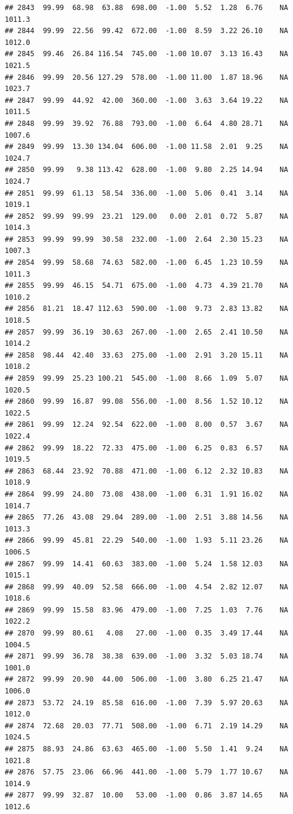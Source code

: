 \documentclass{article}\usepackage{graphicx, color}
\makeatletter
\newenvironment{kframe}{%
 \def\at@end@of@kframe{}%
 \ifinner\ifhmode%
  \def\at@end@of@kframe{\end{minipage}}%
  \begin{minipage}{\columnwidth}%
 \fi\fi%
 \def\FrameCommand##1{\hskip\@totalleftmargin \hskip-\fboxsep
 \colorbox{shadecolor}{##1}\hskip-\fboxsep
     \hskip-\linewidth \hskip-\@totalleftmargin \hskip\columnwidth}%
 \MakeFramed {\advance\hsize-\width
   \@totalleftmargin\z@ \linewidth\hsize
   \@setminipage}}%
 {\par\unskip\endMakeFramed%
 \at@end@of@kframe}
\newenvironment{knitrout}{}{} %
\makeatother
\begin{document}
\begin{knitrout}
\begin{kframe}
\begin{verbatim}
## 2843  99.99  68.98  63.88  698.00  -1.00  5.52  1.28  6.76    NA 1011.3
## 2844  99.99  22.56  99.42  672.00  -1.00  8.59  3.22 26.10    NA 1012.0
## 2845  99.46  26.84 116.54  745.00  -1.00 10.07  3.13 16.43    NA 1021.5
## 2846  99.99  20.56 127.29  578.00  -1.00 11.00  1.87 18.96    NA 1023.7
## 2847  99.99  44.92  42.00  360.00  -1.00  3.63  3.64 19.22    NA 1011.5
## 2848  99.99  39.92  76.88  793.00  -1.00  6.64  4.80 28.71    NA 1007.6
## 2849  99.99  13.30 134.04  606.00  -1.00 11.58  2.01  9.25    NA 1024.7
## 2850  99.99   9.38 113.42  628.00  -1.00  9.80  2.25 14.94    NA 1024.7
## 2851  99.99  61.13  58.54  336.00  -1.00  5.06  0.41  3.14    NA 1019.1
## 2852  99.99  99.99  23.21  129.00   0.00  2.01  0.72  5.87    NA 1014.3
## 2853  99.99  99.99  30.58  232.00  -1.00  2.64  2.30 15.23    NA 1007.3
## 2854  99.99  58.68  74.63  582.00  -1.00  6.45  1.23 10.59    NA 1011.3
## 2855  99.99  46.15  54.71  675.00  -1.00  4.73  4.39 21.70    NA 1010.2
## 2856  81.21  18.47 112.63  590.00  -1.00  9.73  2.83 13.82    NA 1018.5
## 2857  99.99  36.19  30.63  267.00  -1.00  2.65  2.41 10.50    NA 1014.2
## 2858  98.44  42.40  33.63  275.00  -1.00  2.91  3.20 15.11    NA 1018.2
## 2859  99.99  25.23 100.21  545.00  -1.00  8.66  1.09  5.07    NA 1020.5
## 2860  99.99  16.87  99.08  556.00  -1.00  8.56  1.52 10.12    NA 1022.5
## 2861  99.99  12.24  92.54  622.00  -1.00  8.00  0.57  3.67    NA 1022.4
## 2862  99.99  18.22  72.33  475.00  -1.00  6.25  0.83  6.57    NA 1019.5
## 2863  68.44  23.92  70.88  471.00  -1.00  6.12  2.32 10.83    NA 1018.9
## 2864  99.99  24.80  73.08  438.00  -1.00  6.31  1.91 16.02    NA 1014.7
## 2865  77.26  43.08  29.04  289.00  -1.00  2.51  3.88 14.56    NA 1013.3
## 2866  99.99  45.81  22.29  540.00  -1.00  1.93  5.11 23.26    NA 1006.5
## 2867  99.99  14.41  60.63  383.00  -1.00  5.24  1.58 12.03    NA 1015.1
## 2868  99.99  40.09  52.58  666.00  -1.00  4.54  2.82 12.07    NA 1018.6
## 2869  99.99  15.58  83.96  479.00  -1.00  7.25  1.03  7.76    NA 1022.2
## 2870  99.99  80.61   4.08   27.00  -1.00  0.35  3.49 17.44    NA 1004.5
## 2871  99.99  36.78  38.38  639.00  -1.00  3.32  5.03 18.74    NA 1001.0
## 2872  99.99  20.90  44.00  506.00  -1.00  3.80  6.25 21.47    NA 1006.0
## 2873  53.72  24.19  85.58  616.00  -1.00  7.39  5.97 20.63    NA 1012.0
## 2874  72.68  20.03  77.71  508.00  -1.00  6.71  2.19 14.29    NA 1024.5
## 2875  88.93  24.86  63.63  465.00  -1.00  5.50  1.41  9.24    NA 1021.8
## 2876  57.75  23.06  66.96  441.00  -1.00  5.79  1.77 10.67    NA 1014.9
## 2877  99.99  32.87  10.00   53.00  -1.00  0.86  3.87 14.65    NA 1012.6

\end{verbatim}
\end{kframe}
\end{knitrout}
\end{document}
